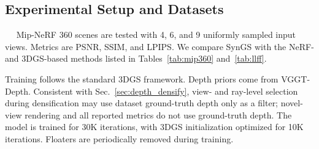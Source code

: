 \subsection{Experimental Setup and Datasets}
\label{sec:setup}

~\cite{Barron22_MipNeRF360}~\cite{Mildenhall19_LLFF} Mip-NeRF 360 scenes are tested with 4, 6, and 9 uniformly sampled input views. Metrics are PSNR, SSIM, and LPIPS. We compare SynGS with the NeRF- and 3DGS-based methods listed in Tables~\ref{tab:mip360} and~\ref{tab:llff}.

Training follows the standard 3DGS framework. Depth priors come from VGGT-Depth. Consistent with Sec.~\ref{sec:depth_densify}, view- and ray-level selection during densification may use dataset ground-truth depth only as a filter; novel-view rendering and all reported metrics do not use ground-truth depth. The model is trained for 30K iterations, with 3DGS initialization optimized for 10K iterations. Floaters are periodically removed during training. 
